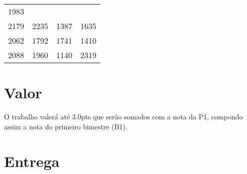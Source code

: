 \documentclass[a4paper]{article}
\begin{document}
\begin{longtable}[c]{@{}cccc@{}}
\begin{minipage}[t]{0.06\columnwidth}
1983
\strut\end{minipage}\tabularnewline
\begin{minipage}[t]{0.06\columnwidth}\centering\strut
2179
\strut\end{minipage} &
\begin{minipage}[t]{0.06\columnwidth}\centering\strut
2235
\strut\end{minipage} &
\begin{minipage}[t]{0.06\columnwidth}\centering\strut
1387
\strut\end{minipage} &
\begin{minipage}[t]{0.06\columnwidth}\centering\strut
1635
\strut\end{minipage}\tabularnewline
\begin{minipage}[t]{0.06\columnwidth}\centering\strut
2062
\strut\end{minipage} &
\begin{minipage}[t]{0.06\columnwidth}\centering\strut
1792
\strut\end{minipage} &
\begin{minipage}[t]{0.06\columnwidth}\centering\strut
1741
\strut\end{minipage} &
\begin{minipage}[t]{0.06\columnwidth}\centering\strut
1410
\strut\end{minipage}\tabularnewline
\begin{minipage}[t]{0.06\columnwidth}\centering\strut
2088
\strut\end{minipage} &
\begin{minipage}[t]{0.06\columnwidth}\centering\strut
1960
\strut\end{minipage} &
\begin{minipage}[t]{0.06\columnwidth}\centering\strut
1140
\strut\end{minipage} &
\begin{minipage}[t]{0.06\columnwidth}\centering\strut
2319
\strut\end{minipage}\tabularnewline
\bottomrule
\end{longtable}

\section{Valor}
O trabalho valerá até $3.0$pts que serão somados com a nota da P1, compondo assim a nota do primeiro bimestre (B1).

\section{Entrega}
\end{document}
